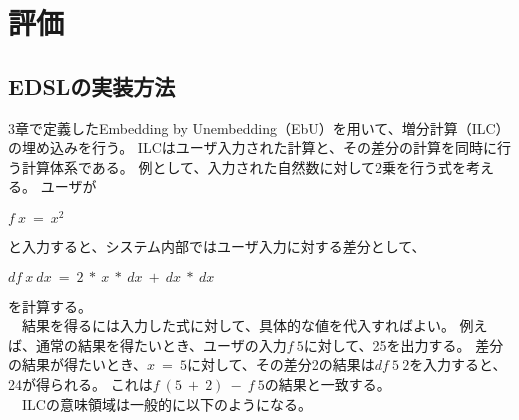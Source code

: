 \documentclass[uplatex]{sumiilab-paper}
\theoremstyle{mystyle}
\numberwithin{definition}{chapter} %
\begin{document}




\chapter{評価}
\section{EDSLの実装方法}
3章で定義したEmbedding by Unembedding（EbU）を用いて、増分計算（ILC）\cite{ilc2014_Cai}の埋め込みを行う。
ILCはユーザ入力された計算と、その差分の計算を同時に行う計算体系である。
例として、入力された自然数に対して2乗を行う式を考える。
ユーザが　

$f~x~=~x^2$

と入力すると、システム内部ではユーザ入力に対する差分として、

$df~x~dx~=~2~*~x~*~dx~+~dx~*~dx$

を計算する。\\
　結果を得るには入力した式に対して、具体的な値を代入すればよい。
例えば、通常の結果を得たいとき、ユーザの入力$f~5$に対して、25を出力する。
差分の結果が得たいとき、$x~=~5$に対して、その差分2の結果は$df~5~2$を入力すると、24が得られる。
これは$f~(5~+~2)~-~f~5$の結果と一致する。\\
　ILCの意味領域は一般的に以下のようになる。
\end{document}
